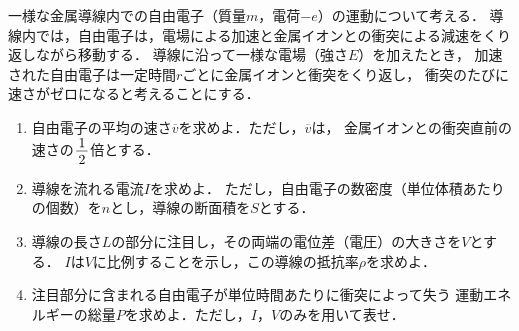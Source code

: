 ﻿\documentclass[../../../ps_q.tex]{subfiles}
\begin{document}
    一様な金属導線内での自由電子（質量$m$，電荷$-e$）の運動について考える．%
    導線内では，自由電子は，電場による加速と金属イオンとの衝突による減速をくり返しながら移動する．%
    導線に沿って一様な電場（強さ$E$）を加えたとき，%
    加速された自由電子は一定時間$r$ごとに金属イオンと衝突をくり返し，%
    衝突のたびに速さがゼロになると考えることにする．

    \begin{enumerate}
        \item 自由電子の平均の速さ$\overline{v}$を求めよ．ただし，$\overline{v}$は，%
            金属イオンとの衝突直前の速さの$\myfraca{1}{2}$倍とする．
        \item 導線を流れる電流$I$を求めよ．%
            ただし，自由電子の数密度（単位体積あたりの個数）を$n$とし，導線の断面積を$S$とする．
        \item 導線の長さ$L$の部分に注目し，その両端の電位差（電圧）の大きさを$V$とする．%
            $I$は$V$に比例することを示し，この導線の抵抗率$\rho$を求めよ．
        \item 注目部分に含まれる自由電子が単位時間あたりに衝突によって失う%
            運動エネルギーの総量$P$を求めよ．ただし，$I$，$V$のみを用いて表せ．
    \end{enumerate}
\end{document}
